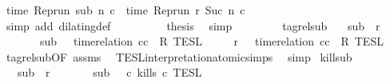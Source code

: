 \begin{isabellebody}
\ {\isacartoucheopen}time\ {\isacharparenleft}{\isacharparenleft}Rep{\isacharunderscore}run\ sub{\isacharparenright}\ n\ c\ {\isacharequal}\ time\ {\isacharparenleft}{\isacharparenleft}Rep{\isacharunderscore}run\ r{\isacharparenright}\ {\isacharparenleft}Suc\ n{\isacharparenright}\ c\isanewline
\ \ \ \ \ \ \ \ \isamarkupfalse%
\ {\isacharparenleft}simp\ add{\isacharcolon}\ dilating{\isacharunderscore}def{\isacharparenright}\isanewline
\ \ \ \ \ \ \isamarkupfalse%
\ \isamarkupfalse%
\ {\isacharquery}thesis\ \isamarkupfalse%
\ simp\isanewline
\ \ \ \ \isamarkupfalse%
\isanewline
\ \ \isamarkupfalse%
\isanewline
{}\isamarkupfalse%
%
\endisatagproof
{\isafoldproof}%
%
\isadelimproof
\isanewline
%
\endisadelimproof
\isanewline
{}\isamarkupfalse%
\ tagrel{\isacharunderscore}sub{\isacharcolon}\isanewline
\ \ \ {\isacartoucheopen}sub\ {\isasymlless}\ r{\isacartoucheclose}\isanewline
\ \ \ \ \ \ \ {\isacartoucheopen}sub\ {\isasymin}\ {\isasymlbrakk}\ time{\isacharminus}relation\ {\isasymlfloor}cc\ {\isasymin}\ R\ {\isasymrbrakk}\isactrlsub T\isactrlsub E\isactrlsub S\isactrlsub L{\isacartoucheclose}\isanewline
\ \ \ \ \ {\isacartoucheopen}r\ {\isasymin}\ {\isasymlbrakk}\ time{\isacharminus}relation\ {\isasymlfloor}cc\ {\isasymin}\ R\ {\isasymrbrakk}\isactrlsub T\isactrlsub E\isactrlsub S\isactrlsub L{\isacartoucheclose}\isanewline
%
\isadelimproof
%
\endisadelimproof
%
\isatagproof
{}\isamarkupfalse%
\ tagrel{\isacharunderscore}sub{\isacharprime}{\isacharbrackleft}OF\ assms{\isacharbrackright}\ \isamarkupfalse%
\ TESL{\isacharunderscore}interpretation{\isacharunderscore}atomic{\isachardot}simps{\isacharparenleft}{}{\isacharparenright}\ \isamarkupfalse%
\ simp%
\endisatagproof
{\isafoldproof}%
%
\isadelimproof
\isanewline
%
\endisadelimproof
\isanewline
{}\isamarkupfalse%
\ kill{\isacharunderscore}sub{\isacharcolon}\isanewline
\ \ \ {\isacartoucheopen}sub\ {\isasymlless}\ r{\isacartoucheclose}\isanewline
\ \ \ \ \ \ \ {\isacartoucheopen}sub\ {\isasymin}\ {\isasymlbrakk}\ c\ kills\ c\ {\isasymrbrakk}\isactrlsub T\isactrlsub E\isactrlsub S\isactrlsub L{\isacartoucheclose}\isanewline

\end{isabellebody}
